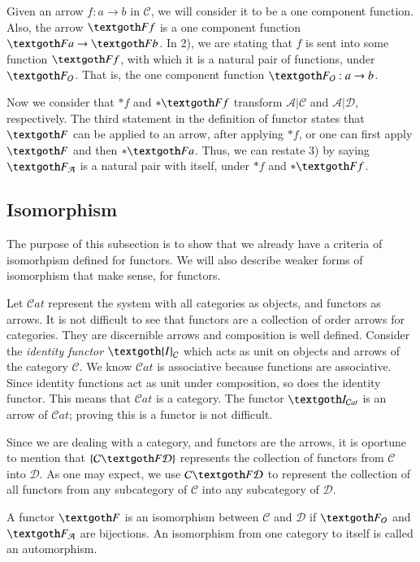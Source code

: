 \documentclass [12pt]{book}
\begin{document}
Given an arrow $f:a\rightarrow b$ in $\mathcal C$, we will consider it to be a one component function. Also, the arrow $\textgoth Ff$ is a one component function $\textgoth Fa\rightarrow\textgoth Fb$. In 2), we are stating that $f$ is sent into some function $\textgoth Ff$, with which it is a natural pair of functions, under $\textgoth F_\mathcal O$. That is, the one component function $\textgoth F_\mathcal O:a\rightarrow b$.

Now we consider that $*f$ and $*\textgoth Ff$ transform $\mathcal{A|C}$ and $\mathcal{A|D}$, respectively. The third statement in the definition of functor states that $\textgoth F$ can be applied to an arrow, after applying $*f$, or one can first apply $\textgoth F$ and then $*\textgoth Fa$. Thus, we can restate 3) by saying $\textgoth F_\mathcal A$ is a natural pair with itself, under $*f$ and $*\textgoth Ff$.

		\subsection{Isomorphism}

The purpose of this subsection is to show that we already have a criteria of isomorhpism defined for functors. We will also describe weaker forms of isomorphism that make sense, for functors. 

Let $\mathcal Cat$ represent the system with all categories as objects, and functors as arrows. It is not difficult to see that functors are a collection of order arrows for categories. They are discernible arrows and composition is well defined. Consider the \textit{identity functor} $\textgoth{I}_\mathcal C$ which acts as unit on objects and arrows of the category $\mathcal C$. We know $\mathcal Cat$ is associative because functions are associative. Since identity functions act as unit under composition, so does the identity functor. This means that $\mathcal Cat$ is a category. The functor $\textgoth I_{\mathcal Cat}$ is an arrow of $\mathcal Cat$; proving this is a functor is not difficult.

Since we are dealing with a category, and functors are the arrows, it is oportune to mention that $\{\mathcal C\textgoth F\mathcal D\}$ represents the collection of functors from $\mathcal C$ into $\mathcal D$. As one may expect, we use $\mathcal C\textgoth F\mathcal D$ to represent the collection of all functors from any subcategory of $\mathcal C$ into any subcategory of $\mathcal D$.

\begin{definition}A functor $\textgoth F$ is an isomorphism between $\mathcal C$ and $\mathcal D$ if $\textgoth F_\mathcal O$ and $\textgoth F_\mathcal A$ are bijections. An isomorphism from one category to itself is called an automorphism.\end{definition}
\end{document}
